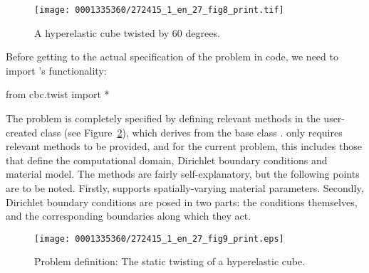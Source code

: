 \begin{figure}[!t]
  \centering
  \texttt{[image: 0001335360/272415\_1\_en\_27\_fig8\_print.tif]}
  \caption{A hyperelastic cube twisted by 60 degrees.}
    \label{fig:narayanan:twistedcube}
\end{figure}

Before getting to the actual specification of the problem in code, we
need to import \twist's functionality:
\begin{python}
from cbc.twist import *
\end{python}
The problem is completely specified by defining relevant methods in
the user-created class  (see
Figure~\ref{code:narayanan:statictwist}), which derives from the base
class . \twist{} only requires relevant
methods to be provided, and for the current problem, this includes
those that define the computational domain, Dirichlet boundary
conditions and material model. The methods are fairly
self-explanatory, but the following points are to be noted. Firstly,
\twist{} supports spatially-varying material parameters. Secondly,
Dirichlet boundary conditions are posed in two parts: the conditions
themselves, and the corresponding boundaries along which they act.

\makeatletter
\def\img@cmode{\hskip-5pt\begin{turn}{90}\rlap{\kern120\p@\@img@cmode{\@cmodetext}}\end{turn}}
\makeatother

\begin{figure}[!t]
\texttt{[image: 0001335360/272415\_1\_en\_27\_fig9\_print.eps]}
\caption{Problem definition: The static twisting of a hyperelastic
  cube.}
\label{code:narayanan:statictwist}\vspace*{12pt}
\end{figure}

